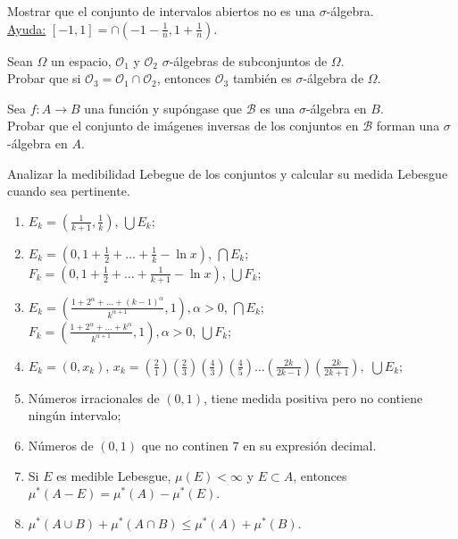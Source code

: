 \documentclass{book}
\begin{document}
\begin{ejer}{} 
Mostrar que el conjunto de intervalos abiertos no es una $\sigma$-\'algebra.
\\
\underline{Ayuda:} $[-1,1]=\cap \left(-1-\frac{1}{n},1+\frac{1}{n}\right)$. 
\end{ejer} 

\begin{ejer} 
Sean $\Omega$ un espacio, $\mathcal{O}_1$ y  $\mathcal{O}_2$ $\sigma$-\'algebras de subconjuntos de 
$\Omega$. \\
Probar que si $\mathcal{O}_3=\mathcal{O}_1\cap \mathcal{O}_2$, entonces $\mathcal{O}_3$ 
tambi\'en es $\sigma$-\'algebra de $\Omega$. 
\end{ejer} 


\begin{ejer}{} 
Sea $f: A\to B$ una funci\'on  y sup\'ongase que $\mathcal{B}$ es una $\sigma$-\'algebra en $B$. \\
Probar que el conjunto de im\'agenes inversas de los conjuntos en $\mathcal{B}$  forman una 
$\sigma$-\'algebra en $A$. 
\end{ejer}
 
\begin{ejer}{}
Analizar la medibilidad Lebegue de los conjuntos y calcular su medida Lebesgue cuando sea pertinente.

\begin{enumerate}
\item $E_k=\left(\frac{1}{k+1},\frac{1}{k}\right)$, $\bigcup E_k$;
\item $E_k=\left(0,1+\frac{1}{2}+\dots+\frac{1}{k}-\ln x\right)$, $\bigcap E_k$; \\
$F_k=\left(0,1+\frac{1}{2}+\dots+\frac{1}{k+1}-\ln x\right)$, $\bigcup F_k$; 
\item $E_k=\left(\frac{1+2^{\alpha}+\dots+(k-1)^{\alpha}}{k^{\alpha + 1}},1\right), \alpha>0$, $\bigcap E_k$;\\
$F_k=\left(\frac{1+2^{\alpha}+\dots+k^{\alpha}}{k^{\alpha + 1}},1\right), \alpha>0$, $\bigcup F_k$;
\item $E_k=(0,x_k)$, $x_k=(\frac{2}{1})(\frac{2}{3})(\frac{4}{3})(\frac{4}{5})\dots(\frac{2k}{2k-1})(\frac{2k}{2k+1}),$
$\bigcup E_k;$
\item N\'umeros irracionales de $(0,1)$, tiene medida positiva pero no contiene ning\'un intervalo;
\item N\'umeros de $(0,1)$ que no continen $7$ en su expresi\'on decimal.
\item Si $E$ es medible Lebesgue, $\mu(E)<\infty$ y $E\subset A$, entonces $\mu^*(A-E)=\mu^*(A)-\mu^*(E)$.
\item $\mu^*(A \cup B)+\mu^*(A\cap B) \leq \mu^*(A)+\mu^*(B)$.
\end{enumerate}
\end{ejer} 
\end{document}
